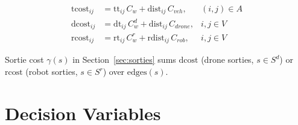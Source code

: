 \documentclass[10pt]{article}
\begin{document}
\begin{align}
\mathrm{tcost}_{ij} &= \mathrm{tt}_{ij}\,C_w + \mathrm{dist}_{ij}\,C_{veh}, & (i,j)\in A \label{eq:tcost}\\
\mathrm{dcost}_{ij} &= \mathrm{dt}_{ij}\,C^d_w + \mathrm{dist}_{ij}\,C_{drone}, & i,j\in V \label{eq:dcost}\\
\mathrm{rcost}_{ij} &= \mathrm{rt}_{ij}\,C^r_w + \mathrm{rdist}_{ij}\,C_{rob}, & i,j\in V \label{eq:rcost}
\end{align}

\noindent Sortie cost $\gamma(s)$ in Section~\ref{sec:sorties} sums $\mathrm{dcost}$
(drone sorties, $s\in S^d$) or $\mathrm{rcost}$ (robot sorties, $s\in S^r$) over
$\mathrm{edges}(s)$.

\section{Decision Variables}
\label{sec:variables}
\end{document}
